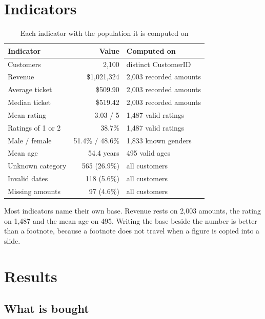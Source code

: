 \documentclass[12pt,a4paper]{article}
\begin{document}
\section{Indicators}

\begin{table}[H]\centering\singlespacing
\caption{Each indicator with the population it is computed on}
\small
\begin{tabular}{@{}lrl@{}}
\toprule
\textbf{Indicator} & \textbf{Value} & \textbf{Computed on} \\ \midrule
Customers & 2{,}100 & distinct CustomerID \\
Revenue & \$1{,}021{,}324 & 2{,}003 recorded amounts \\
Average ticket & \$509.90 & 2{,}003 recorded amounts \\
Median ticket & \$519.42 & 2{,}003 recorded amounts \\ \midrule
Mean rating & 3.03 / 5 & 1{,}487 valid ratings \\
Ratings of 1 or 2 & 38.7\% & 1{,}487 valid ratings \\ \midrule
Male / female & 51.4\% / 48.6\% & 1{,}833 known genders \\
Mean age & 54.4 years & 495 valid ages \\ \midrule
Unknown category & 565 (26.9\%) & all customers \\
Invalid dates & 118 (5.6\%) & all customers \\
Missing amounts & 97 (4.6\%) & all customers \\
\bottomrule
\end{tabular}
\end{table}

Most indicators name their own base. Revenue rests on 2{,}003 amounts, the rating on
1{,}487 and the mean age on 495. Writing the base beside the number is better than a
footnote, because a footnote does not travel when a figure is copied into a slide.

\section{Results}

\subsection{What is bought}
\end{document}
